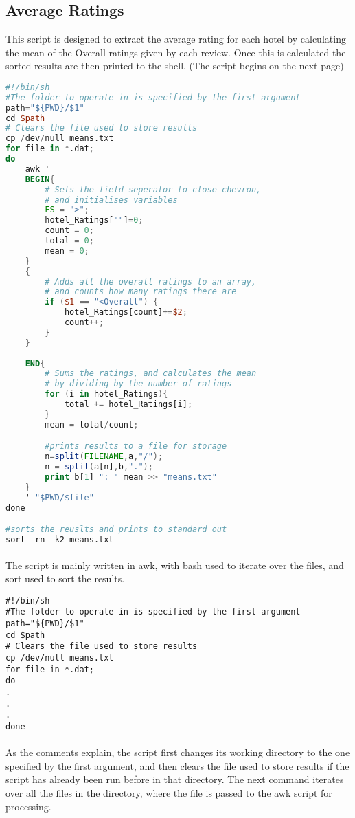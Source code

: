 \documentclass[10pt]{article}
\begin{document}
\subsection{Average Ratings}
This script is designed to extract the average rating for each hotel by calculating the mean of the Overall ratings given by each review. Once this is calculated the sorted results are then printed to the shell. (The script begins on the next page)
\pagebreak
\begin{lstlisting}[basicstyle = \small\ttfamily, language=awk, morekeywords={cp,cd,sort,done}]
#!/bin/sh
#The folder to operate in is specified by the first argument
path="${PWD}/$1"
cd $path
# Clears the file used to store results
cp /dev/null means.txt
for file in *.dat;
do
	awk ' 
	BEGIN{
		# Sets the field seperator to close chevron, 
		# and initialises variables
		FS = ">"; 
		hotel_Ratings[""]=0;
		count = 0;
		total = 0;
		mean = 0;
	}
	{
		# Adds all the overall ratings to an array,
		# and counts how many ratings there are
		if ($1 == "<Overall") {
			hotel_Ratings[count]+=$2;
			count++;
		}
	}
	
	END{
		# Sums the ratings, and calculates the mean 
		# by dividing by the number of ratings
		for (i in hotel_Ratings){
			total += hotel_Ratings[i];
		}
		mean = total/count;

		#prints results to a file for storage
		n=split(FILENAME,a,"/");
		n = split(a[n],b,".");
		print b[1] ": " mean >> "means.txt"
	}
	' "$PWD/$file" 
done

#sorts the reuslts and prints to standard out
sort -rn -k2 means.txt

\end{lstlisting}
\pagebreak
\paragraph{}
The script is mainly written in awk, with bash used to iterate over the files, and sort used to sort the results.
\begin{lstlisting}[basicstyle=\ttfamily\small]
#!/bin/sh
#The folder to operate in is specified by the first argument
path="${PWD}/$1"
cd $path
# Clears the file used to store results
cp /dev/null means.txt
for file in *.dat;
do
.
.
.
done
\end{lstlisting}
\paragraph{}
As the comments explain, the script first changes its working directory to the one specified by the first argument, and then clears the file used to store results if the script has already been run before in that directory. The next command iterates over all the files in the directory, where the file is passed to the awk script for processing.
\end{document}
